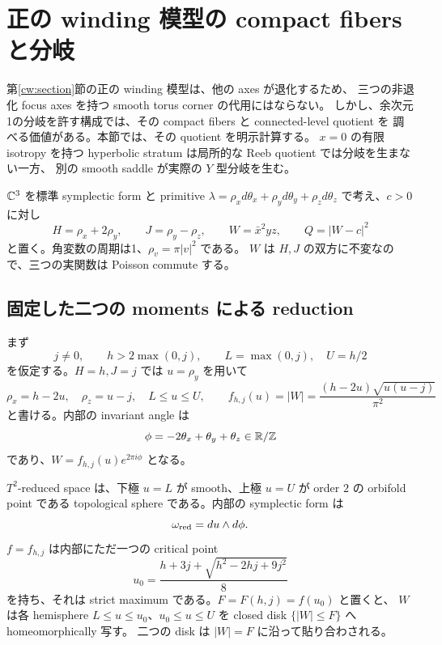 \section{正の winding 模型の compact fibers と分岐}
\label{pw:section}

第\ref{cw:section}節の正の winding 模型は、他の axes が退化するため、
三つの非退化 focus axes を持つ smooth torus corner の代用にはならない。
しかし、余次元1の分岐を許す構成では、その compact fibers と connected-level quotient を
調べる価値がある。本節では、その quotient を明示計算する。
$x=0$ の有限 isotropy を持つ hyperbolic stratum は局所的な Reeb quotient では分岐を生まない一方、
別の smooth saddle が実際の $Y$ 型分岐を生む。

$\mathbb C^3$ を標準 symplectic form と primitive
$\lambda=\rho_xd\theta_x+\rho_yd\theta_y+\rho_zd\theta_z$ で考え、$c>0$ に対し
\begin{equation}\label{pw:model}
 H=\rho_x+2\rho_y,\qquad J=\rho_y-\rho_z,\qquad
 W=\bar x^2yz,\qquad Q=|W-c|^2
\end{equation}
と置く。角変数の周期は1、$\rho_v=\pi|v|^2$ である。
$W$ は $H,J$ の双方に不変なので、三つの実関数は Poisson commute する。

\subsection{固定した二つの moments による reduction}

まず
\[
 j\ne0,\qquad h>2\max(0,j),\qquad
 L=\max(0,j),\quad U=h/2
\]
を仮定する。$H=h,J=j$ では $u=\rho_y$ を用いて
\begin{equation}\label{pw:radial}
 \rho_x=h-2u,\quad \rho_z=u-j,\quad L\le u\le U,
 \qquad
 f_{h,j}(u)=|W|=\frac{(h-2u)\sqrt{u(u-j)}}{\pi^2}
\end{equation}
と書ける。内部の invariant angle は
\[
 \phi=-2\theta_x+\theta_y+\theta_z\in\mathbb R/\mathbb Z
\]
であり、$W=f_{h,j}(u)e^{2\pi i\phi}$ となる。

\begin{proposition}
\label{pw:reduction}
$T^2$-reduced space は、下極 $u=L$ が smooth、上極 $u=U$ が order $2$ の orbifold point
である topological sphere である。内部の symplectic form は
\[
 \omega_{\rm red}=du\wedge d\phi.
\]
$f=f_{h,j}$ は内部にただ一つの critical point
\begin{equation}\label{pw:maximum-point}
 u_0=\frac{h+3j+\sqrt{h^2-2hj+9j^2}}8
\end{equation}
を持ち、それは strict maximum である。$F=F(h,j)=f(u_0)$ と置くと、
$W$ は各 hemisphere $L\le u\le u_0$、$u_0\le u\le U$ を
closed disk $\{|W|\le F\}$ へ homeomorphically 写す。
二つの disk は $|W|=F$ に沿って貼り合わされる。
\end{proposition}

